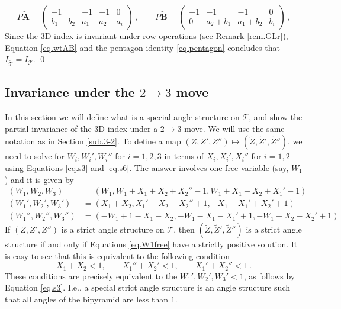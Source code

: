 \documentclass[12pt]{amsart}
\theoremstyle{definition}
\def\calT{\mathcal T}
\def\be{  \begin{equation} }
\def\ee{  \end{equation} }
\newcommand{\mb}{\mathbf}
\newcommand{\wt}{\widetilde}
\numberwithin{equation}{section}
\begin{document}
\be 
\label{eq.wtAB}
P \wt{\mb A} = \begin{pmatrix} -1 & -1 & -1  & 0 \\ 
b_1+b_2 & a_1 & a_2 & a_i \end{pmatrix}\,,\qquad P \wt{\mb B} 
=\begin{pmatrix} -1 & -1 & -1 & 0 \\ 0 & a_2+b_1 & a_1+b_2 & b_i 
\end{pmatrix}\,,
\ee
Since the 3D index is invariant under row operations (see Remark 
\ref{rem.GLr}), Equation \eqref{eq.wtAB} and the pentagon identity
\eqref{eq.pentagon} concludes that $I_{\wt{\calT}}=I_{\calT}$.
\qed

\subsection{Invariance under the $2\to 3$ move}
\label{sub.2-3}

In this section we will define what is a special angle structure on $\calT$,
and show the partial invariance of the 3D index under a $2\to 3$ move.
We will use the same notation as in Section \ref{sub.3-2}.
To define a map $(Z,Z',Z'') \mapsto (\wt Z,\wt Z',\wt Z'')$, we need to
solve for $W_i,W_i',W_i''$ for $i=1,2,3$ in terms of $X_i,X_i',X_i''$
for $i=1,2$ using Equations \eqref{eq.s3} and \eqref{eq.s6}. The answer
involves one free variable (say, $W_1$) and it is given by
\begin{subequations}
\label{eq.W1free}
\begin{align}
(W_1,W_2,W_3) &=
(W_1,W_1 + X_1 + X_2 + X_2''-1, W_1  + X_1 + X_2 + X_1' -1)
\\
(W_1',W_2',W_3')&=
(X_1 + X_2, X_1'-X_2-X_2''+1,-X_1-X_1'+X_2'+1)
\\
(W_1'',W_2'',W_3'')&= 
(-W_1 + 1 -X_1 -X_2, -W_1 -X_1 -X_1'+1, -W_1-X_2-X_2'+1) 
\end{align}
\end{subequations}
If $(Z,Z',Z'')$ is a strict angle structure on $\calT$, then 
$(\wt Z,\wt Z',\wt Z'')$ is a strict angle structure if and only if
Equations \eqref{eq.W1free} have a strictly positive solution. It is
easy to see that this is equivalent to the following condition
\be
\label{eq.special.angle}
X_1 + X_2 < 1, \qquad X_1''+X_2' < 1, \qquad X_1'+ X_2'' < 1 \,.
\ee
These conditions are precisely equivalent to the $W_1', W_2', W_3' <1$, 
as follows by Equation \eqref{eq.s3}. I.e., a special  strict angle structure
is an angle structure such that all angles of the bipyramid are less than
$1$.
\end{document}
